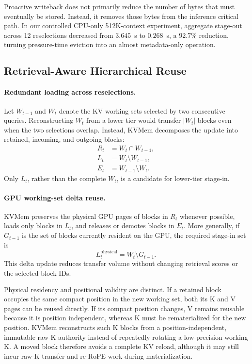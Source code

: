 Proactive writeback does not primarily reduce the number of bytes that must
eventually be stored.  Instead, it removes those bytes from the inference
critical path.  In our controlled CPU-only 512K-context experiment, aggregate
stage-out across 12 reselections decreased from \(3.645\)~s to \(0.268\)~s,
a \(92.7\%\) reduction, turning pressure-time eviction into an almost
metadata-only operation.

\subsection{Retrieval-Aware Hierarchical Reuse}
\label{sec:retrieval-aware-hierarchical-reuse}

\paragraph{Redundant loading across reselections.}
Let \(W_{t-1}\) and \(W_t\) denote the KV working sets selected by two
consecutive queries.  Reconstructing \(W_t\) from a lower tier would transfer
\(\lvert W_t\rvert\) blocks even when the two selections overlap.  Instead,
KVMem decomposes the update into retained, incoming, and outgoing blocks:
\begin{align}
  R_t &= W_t \cap W_{t-1}, \label{eq:retained-set}\\
  L_t &= W_t \setminus W_{t-1}, \label{eq:load-set}\\
  E_t &= W_{t-1} \setminus W_t. \label{eq:evict-set}
\end{align}
Only \(L_t\), rather than the complete \(W_t\), is a candidate for lower-tier
stage-in.

\paragraph{GPU working-set delta reuse.}
KVMem preserves the physical GPU pages of blocks in \(R_t\) whenever possible,
loads only blocks in \(L_t\), and releases or demotes blocks in \(E_t\).  More
generally, if \(G_{t-1}\) is the set of blocks currently resident on the GPU,
the required stage-in set is
\begin{equation}
  L_t^{\mathrm{physical}} = W_t \setminus G_{t-1}.
  \label{eq:physical-load-set}
\end{equation}
This delta update reduces transfer volume without changing retrieval scores or
the selected block IDs.

Physical residency and positional validity are distinct.  If a retained block
occupies the same compact position in the new working set, both its K and V
pages can be reused directly.  If its compact position changes, V remains
reusable because it is position independent, whereas K must be rematerialized
for the new position.  KVMem reconstructs such K blocks from a
position-independent, immutable raw-K authority instead of repeatedly
rotating a low-precision working K.  A moved block therefore avoids a complete
KV reload, although it may still incur raw-K transfer and re-RoPE work during
materialization.

